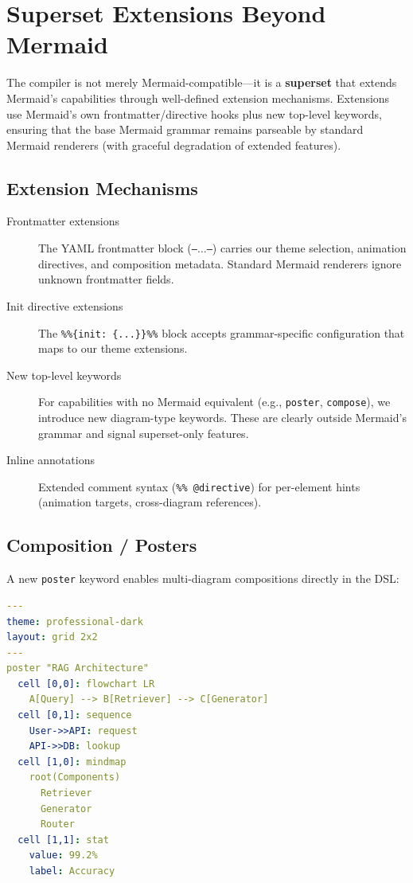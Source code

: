 \section{Superset Extensions Beyond Mermaid}
\label{sec:superset-extensions}

The compiler is not merely Mermaid-compatible---it is a \textbf{superset} that extends
Mermaid's capabilities through well-defined extension mechanisms. Extensions use Mermaid's
own frontmatter/directive hooks plus new top-level keywords, ensuring that the base Mermaid
grammar remains parseable by standard Mermaid renderers (with graceful degradation of
extended features).

\subsection{Extension Mechanisms}

\begin{description}
  \item[Frontmatter extensions] The YAML frontmatter block (\texttt{---}$\ldots$\texttt{---})
        carries our theme selection, animation directives, and composition metadata.
        Standard Mermaid renderers ignore unknown frontmatter fields.

  \item[Init directive extensions] The \texttt{\%\%\{init: \{...\}\}\%\%} block accepts
        grammar-specific configuration that maps to our theme extensions.

  \item[New top-level keywords] For capabilities with no Mermaid equivalent
        (e.g., \texttt{poster}, \texttt{compose}), we introduce new diagram-type keywords.
        These are clearly outside Mermaid's grammar and signal superset-only features.

  \item[Inline annotations] Extended comment syntax (\texttt{\%\% @directive}) for
        per-element hints (animation targets, cross-diagram references).
\end{description}

\subsection{Composition / Posters}
\label{sec:composition-posters}

A new \texttt{poster} keyword enables multi-diagram compositions directly in the DSL:

\begin{lstlisting}[language=yaml,caption={Poster composition in superset DSL}]
---
theme: professional-dark
layout: grid 2x2
---
poster "RAG Architecture"
  cell [0,0]: flowchart LR
    A[Query] --> B[Retriever] --> C[Generator]
  cell [0,1]: sequence
    User->>API: request
    API->>DB: lookup
  cell [1,0]: mindmap
    root(Components)
      Retriever
      Generator
      Router
  cell [1,1]: stat
    value: 99.2%
    label: Accuracy
\end{lstlisting}

